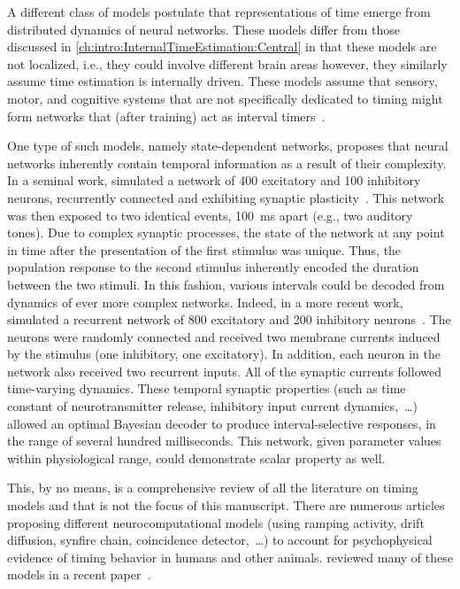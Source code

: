 A different class of models postulate that representations of time emerge from distributed dynamics of neural networks.
These models differ from those discussed in \autoref{ch:intro:InternalTimeEstimation:Central} in that these models are not localized, i.e., they could involve different brain areas however, they similarly assume time estimation is internally driven.
These models assume that sensory, motor, and cognitive systems that are not specifically dedicated to timing might form networks that (after training) act as interval timers~\cite{Wittmann2013NatRevNeurosci}.
\par
One type of such models, namely state-dependent networks, proposes that neural networks inherently contain temporal information as a result of their complexity.
In a seminal work, \citeauthor{Karmarkar2007Neuron} simulated a network of 400 excitatory and 100 inhibitory neurons, recurrently connected and exhibiting synaptic plasticity~\cite{Karmarkar2007Neuron}.
This network was then exposed to two identical events, 100~ms apart (e.g., two auditory tones).
Due to complex synaptic processes, the state of the network at any point in time after the presentation of the first stimulus was unique.
Thus, the population response to the second stimulus inherently encoded the duration between the two stimuli.
In this fashion, various intervals could be decoded from dynamics of ever more complex networks.
Indeed, in a more recent work, \citeauthor{Perez2018JNeurosci} simulated a recurrent network of 800 excitatory and 200 inhibitory neurons~\cite{Perez2018JNeurosci}.
The neurons were randomly connected and received two membrane currents induced by the stimulus (one inhibitory, one excitatory).
In addition, each neuron in the network also received two recurrent inputs.
All of the synaptic currents followed time-varying dynamics.
These temporal synaptic properties (such as time constant of neurotransmitter release, inhibitory input current dynamics,~\ldots) allowed an optimal Bayesian decoder to produce interval-selective responses, in the range of several hundred milliseconds.
This network, given parameter values within physiological range, could demonstrate scalar property as well.
\par
This, by no means, is a comprehensive review of all the literature on timing models and that is not the focus of this manuscript.
There are numerous articles proposing different neurocomputational models (using ramping activity, drift diffusion, synfire chain, coincidence detector,~\ldots) to account for psychophysical evidence of timing behavior in humans and other animals.
 reviewed many of these models in a recent paper~\cite{Paton2018NeuronRev}.